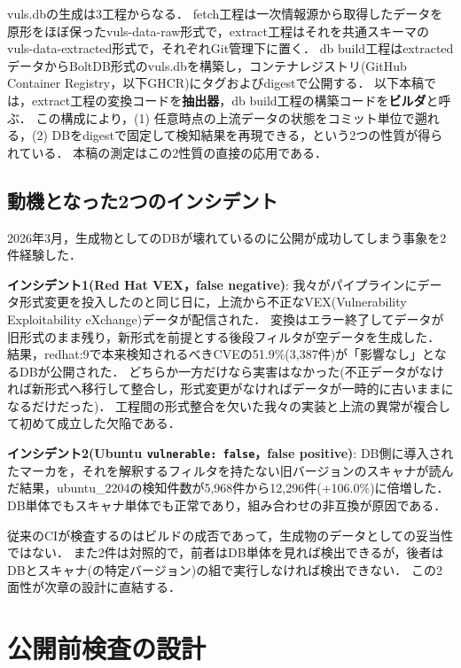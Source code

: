 \documentclass{css}
\begin{document}
vuls.dbの生成は3工程からなる\cite{nakaoka2025,vuls-data-update,vuls-data-db}．
fetch工程は一次情報源から取得したデータを原形をほぼ保ったvuls-data-raw形式で，extract工程はそれを共通スキーマのvuls-data-extracted形式で，それぞれGit管理下に置く．
db build工程はextractedデータからBoltDB形式のvuls.dbを構築し，コンテナレジストリ(GitHub Container Registry，以下GHCR)にタグおよびdigestで公開する．
以下本稿では，extract工程の変換コードを\textbf{抽出器}，db build工程の構築コードを\textbf{ビルダ}と呼ぶ．
この構成により，(1) 任意時点の上流データの状態をコミット単位で遡れる，(2) DBをdigestで固定して検知結果を再現できる，という2つの性質が得られている．
本稿の測定はこの2性質の直接の応用である．

\subsection{動機となった2つのインシデント}
\label{sec:incidents}

2026年3月，生成物としてのDBが壊れているのに公開が成功してしまう事象を2件経験した．

\textbf{インシデント1(Red Hat VEX，false negative)}:
我々がパイプラインにデータ形式変更を投入したのと同じ日に，上流から不正なVEX(Vulnerability Exploitability eXchange)データが配信された．
変換はエラー終了してデータが旧形式のまま残り，新形式を前提とする後段フィルタが空データを生成した．
結果，redhat:9で本来検知されるべきCVEの51.9\%(3,387件)が「影響なし」となるDBが公開された．
どちらか一方だけなら実害はなかった(不正データがなければ新形式へ移行して整合し，形式変更がなければデータが一時的に古いままになるだけだった)．
工程間の形式整合を欠いた我々の実装と上流の異常が複合して初めて成立した欠陥である．

\textbf{インシデント2(Ubuntu \texttt{vulnerable: false}，false positive)}:
DB側に導入されたマーカを，それを解釈するフィルタを持たない旧バージョンのスキャナが読んだ結果，ubuntu\_2204の検知件数が5,968件から12,296件(+106.0\%)に倍増した．
DB単体でもスキャナ単体でも正常であり，組み合わせの非互換が原因である．

従来のCIが検査するのはビルドの成否であって，生成物のデータとしての妥当性ではない．
また2件は対照的で，前者はDB単体を見れば検出できるが，後者はDBとスキャナ(の特定バージョン)の組で実行しなければ検出できない．
この2面性が次章の設計に直結する．

\section{公開前検査の設計}
\label{sec:design}
\end{document}
